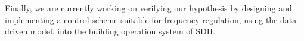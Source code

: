 

Finally, we are currently working on verifying our hypothesis by designing and implementing a control scheme suitable for frequency regulation, using the data-driven model, into the building operation system of SDH.

